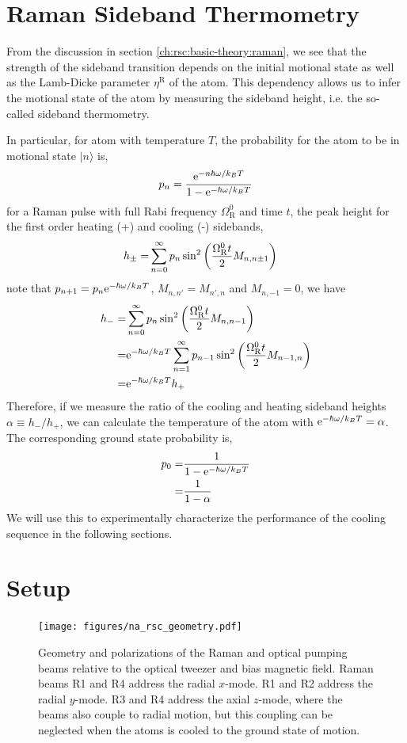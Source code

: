 \section{Raman Sideband Thermometry}

From the discussion in section \ref{ch:rsc:basic-theory:raman},
we see that the strength of the sideband transition depends on the initial motional state
as well as the Lamb-Dicke parameter $\eta^{\mathrm{R}}$ of the atom.
This dependency allows us to infer the motional state of the atom
by measuring the sideband height, i.e. the so-called sideband thermometry.

In particular, for atom with temperature $T$,
the probability for the atom to be in motional state $|n\rangle$ is,
\[ p_n=\frac{\mathrm{e}^{-n\hbar\omega/k_BT}}{1-\mathrm{e}^{-\hbar\omega/k_BT}} \]
for a Raman pulse with full Rabi frequency $\Omega_{\mathrm{R}}^0$ and time $t$,
the peak height for the first order heating (+) and cooling (-) sidebands,
\begin{align*}
  h_\pm=&\sum_{n=0}^\infty p_n\sin^2{\left({\frac{\Omega_{\mathrm{R}}^0t}{2}M_{n,n\pm1}}\right)}
\end{align*}
note that $p_{n+1}=p_n\mathrm{e}^{-\hbar\omega/k_BT}$, $M_{n,n'}=M_{n',n}$ and $M_{n,-1}=0$, we have
\begin{align*}
  h_-=&\sum_{n=0}^\infty p_n\sin^2{\left({\frac{\Omega_{\mathrm{R}}^0t}{2}M_{n,n-1}}\right)}\\
  =&\mathrm{e}^{-\hbar\omega/k_BT}\sum_{n=1}^\infty p_{n-1}\sin^2{\left({\frac{\Omega_{\mathrm{R}}^0t}{2}M_{n-1,n}}\right)}\\
  =&\mathrm{e}^{-\hbar\omega/k_BT}h_+
\end{align*}
Therefore, if we measure the ratio of the cooling and heating sideband heights
$\alpha\equiv h_-/h_+$, we can calculate the temperature of the atom with
$\mathrm{e}^{-\hbar\omega/k_BT}=\alpha$.
The corresponding ground state probability is,
\begin{align*}
  p_0=&\frac{1}{1-\mathrm{e}^{-\hbar\omega/k_BT}}\\
  =&\frac{1}{1-\alpha}
\end{align*}
We will use this to experimentally characterize the performance of the cooling sequence
in the following sections.

\section{Setup}
\label{ch:rsc:setup}

\begin{figure}
  \centering
  \texttt{[image: figures/na\_rsc\_geometry.pdf]}
  \caption[Beams and field geometry for Sodium Raman sideband cooling]{
    Geometry and polarizations of the Raman and optical pumping beams relative to the
    optical tweezer and bias magnetic field.
    Raman beams R1 and R4 address the radial $x$-mode.
    R1 and R2 address the radial $y$-mode.
    R3 and R4 address the axial $z$-mode, where the beams also couple to radial motion,
    but this coupling can be neglected when the atoms is cooled to the ground state of motion.
    \label{fig:rsc:na-geometry}}
\end{figure}

